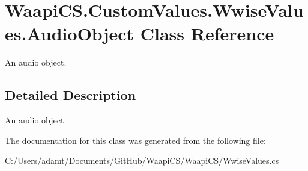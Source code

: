 \hypertarget{class_waapi_c_s_1_1_custom_values_1_1_wwise_values_1_1_audio_object}{}\section{Waapi\+C\+S.\+Custom\+Values.\+Wwise\+Values.\+Audio\+Object Class Reference}
\label{class_waapi_c_s_1_1_custom_values_1_1_wwise_values_1_1_audio_object}


An audio object.  




\subsection{Detailed Description}
An audio object. 



The documentation for this class was generated from the following file\+:\begin{DoxyCompactItemize}
\item 
C\+:/\+Users/adamt/\+Documents/\+Git\+Hub/\+Waapi\+C\+S/\+Waapi\+C\+S/Wwise\+Values.\+cs\end{DoxyCompactItemize}

